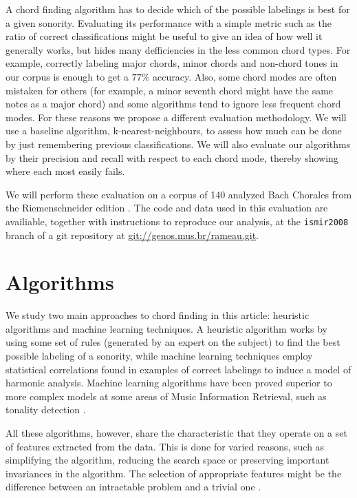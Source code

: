 \documentclass{article}
\newcommand{\comment}[1]{}
\begin{document}
A chord finding algorithm has to decide which of the possible
labelings is best for a given sonority. Evaluating its performance
with a simple metric such as the ratio of correct classifications
might be useful to give an idea of how well it generally works, but
hides many defficiencies in the less common chord types. For example,
correctly labeling major chords, minor chords and non-chord tones in
our corpus is enough to get a $77\%$ accuracy. Also, some chord modes
are often mistaken for others (for example, a minor seventh chord
might have the same notes as a major chord) and some algorithms tend
to ignore less frequent chord modes. For these reasons we propose a
different evaluation methodology. We will use a baseline algorithm,
k-nearest-neighbours, to assess how much can be done by just
remembering previous classifications. We will also evaluate our
algorithms by their precision and recall with respect to each chord
mode, thereby showing where each most easily fails.

We will perform these evaluation on a corpus of 140 analyzed Bach
Chorales from the Riemenschneider edition \cite{bach:371}. The code
and data used in this evaluation are availiable, together with
instructions to reproduce our analysis, at the \texttt{ismir2008}
branch of a git \cite{baudis:git} repository at
\url{git://genos.mus.br/rameau.git}.

\section{Algorithms}
\label{sec:algorithms}

\comment{
  ==> features usadas pelos algoritmos
  ==> técnicas variadas: busca X learning
}

We study two main approaches to chord finding in this article:
heuristic algorithms and machine learning techniques. A heuristic
algorithm works by using some set of rules (generated by an expert on
the subject) to find the best possible labeling of a sonority, while
machine learning techniques employ statistical correlations found in
examples of correct labelings to induce a model of harmonic
analysis. Machine learning algorithms have been proved superior to
more complex models at some areas of Music Information Retrieval, such
as tonality detection \cite{gomez.ea:estimating}.

All these algorithms, however, share the characteristic that they
operate on a set of features extracted from the data. This is done for
varied reasons, such as simplifying the algorithm, reducing the search
space or preserving important invariances in the algorithm. The
selection of appropriate features might be the difference between an
intractable problem and a trivial one \cite{duda.ea:statistical}.
\end{document}
